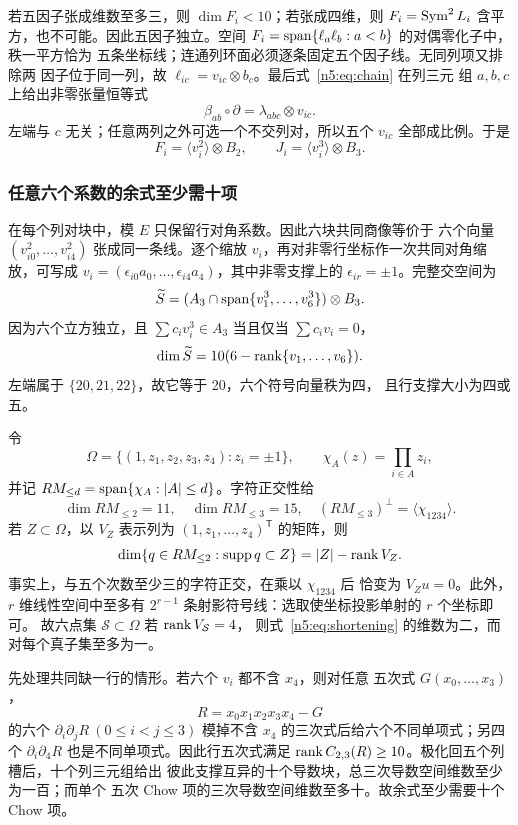 若五因子张成维数至多三，则 \(\dim F_i<10\)；若张成四维，则
\(F_i=\operatorname{Sym}^2L_i\) 含平方，也不可能。因此五因子独立。空间
\(F_i=\operatorname{span}\{\ell_a\ell_b:a<b\}\) 的对偶零化子中，秩一平方恰为
五条坐标线；连通列环面必须逐条固定五个因子线。无同列项又排除两
因子位于同一列，故
\(\ell_{ic}=v_{ic}\otimes b_c\)。最后式~\eqref{n5:eq:chain} 在列三元
组 \(a,b,c\) 上给出非零张量恒等式
\[
 \beta_{ab}\circ\partial=\lambda_{abc}\otimes v_{ic}.
\]
左端与 \(c\) 无关；任意两列之外可选一个不交列对，所以五个
\(v_{ic}\) 全部成比例。于是
\begin{equation}\label{n5:eq:sixblocks}
 F_i=\langle v_i^2\rangle\otimes B_2,\qquad
 J_i=\langle v_i^3\rangle\otimes B_3.
\end{equation}

\subsubsection{任意六个系数的余式至少需十项}

在每个列对块中，模 \(E\) 只保留行对角系数。因此六块共同商像等价于
六个向量 \((v_{i0}^2,\ldots,v_{i4}^2)\) 张成同一条线。逐个缩放
\(v_i\)，再对非零行坐标作一次共同对角缩放，可写成
\(v_i=(\epsilon_{i0}a_0,\ldots,\epsilon_{i4}a_4)\)，其中非零支撑上的
\(\epsilon_{ir}=\pm1\)。完整交空间为
\[
 \widetilde S=
 (A_3\cap\operatorname{span}\{v_1^3,\ldots,v_6^3\})\otimes B_3.
\]
因为六个立方独立，且
\(\sum c_iv_i^3\in A_3\) 当且仅当 \(\sum c_iv_i=0\)，
\[
 \dim\widetilde S=10(6-\operatorname{rank}\{v_1,\ldots,v_6\}).
\]
左端属于 \(\{20,21,22\}\)，故它等于 20，六个符号向量秩为四，
且行支撑大小为四或五。

令
\[
\Omega=\{(1,z_1,z_2,z_3,z_4):z_i=\pm1\},\qquad
\chi_A(z)=\prod_{i\in A}z_i,
\]
并记 \(RM_{\le d}=\operatorname{span}\{\chi_A:|A|\le d\}\)。字符正交性给
\[
\dim RM_{\le2}=11,\quad \dim RM_{\le3}=15,\quad
(RM_{\le3})^\perp=\langle\chi_{1234}\rangle.          \tag{**}
\]
若 \(Z\subset\Omega\)，以 \(V_Z\) 表示列为
\((1,z_1,\ldots,z_4)^{\mathsf T}\) 的矩阵，则
\begin{equation}\label{n5:eq:shortening}
\dim\{q\in RM_{\le2}:\operatorname{supp}q\subset Z\}
=|Z|-\operatorname{rank} V_Z.
\end{equation}
事实上，与五个次数至少三的字符正交，在乘以 \(\chi_{1234}\) 后
恰变为 \(V_Zu=0\)。此外，\(r\) 维线性空间中至多有
\(2^{r-1}\) 条射影符号线：选取使坐标投影单射的 \(r\) 个坐标即可。
故六点集 \(\mathcal S\subset\Omega\) 若 \(\operatorname{rank} V_{\mathcal S}=4\)，
则式~\eqref{n5:eq:shortening} 的维数为二，而对每个真子集至多为一。

先处理共同缺一行的情形。若六个 \(v_i\) 都不含 \(x_4\)，则对任意
五次式 \(G(x_0,\ldots,x_3)\)，
\[
R=x_0x_1x_2x_3x_4-G
\]
的六个 \(\partial_i\partial_jR\ (0\le i<j\le3)\) 模掉不含 \(x_4\)
的三次式后给六个不同单项式；另四个
\(\partial_i\partial_4R\) 也是不同单项式。因此行五次式满足
\(\operatorname{rank} C_{2,3}(R)\ge10\)。极化回五个列槽后，十个列三元组给出
彼此支撑互异的十个导数块，总三次导数空间维数至少为一百；而单个
五次 Chow 项的三次导数空间维数至多十。故余式至少需要十个 Chow 项。

